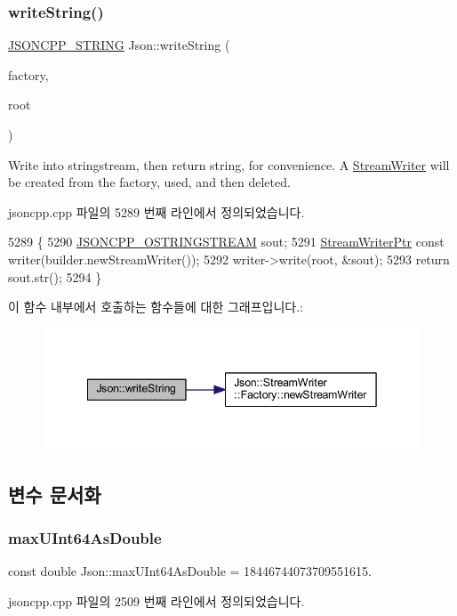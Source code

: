 \subsubsection{\texorpdfstring{write\+String()}{writeString()}}
{\footnotesize\ttfamily \hyperlink{json_8h_a1e723f95759de062585bc4a8fd3fa4be}{J\+S\+O\+N\+C\+P\+P\+\_\+\+S\+T\+R\+I\+NG} Json\+::write\+String (\begin{DoxyParamCaption}\item[{\hyperlink{class_json_1_1_stream_writer_1_1_factory}{Stream\+Writer\+::\+Factory} const \&}]{factory,  }\item[{\hyperlink{class_json_1_1_value}{Value} const \&}]{root }\end{DoxyParamCaption})}



Write into stringstream, then return string, for convenience. A \hyperlink{class_json_1_1_stream_writer}{Stream\+Writer} will be created from the factory, used, and then deleted. 



jsoncpp.\+cpp 파일의 5289 번째 라인에서 정의되었습니다.


\begin{DoxyCode}
5289                                                                                   \{
5290   \hyperlink{json-forwards_8h_a1d06ac2ca63c8c521f41231dfda0e6b3}{JSONCPP\_OSTRINGSTREAM} sout;
5291   \hyperlink{namespace_json_a7132404aeebfc96d7c6ad2c66260afb5}{StreamWriterPtr} \textcolor{keyword}{const} writer(builder.newStreamWriter());
5292   writer->write(root, &sout);
5293   \textcolor{keywordflow}{return} sout.str();
5294 \}
\end{DoxyCode}
이 함수 내부에서 호출하는 함수들에 대한 그래프입니다.\+:\nopagebreak
\begin{figure}[H]
\begin{center}
\leavevmode
\includegraphics[width=342pt]{namespace_json_a00820c0084189e2a7533531c0f250e3f_cgraph}
\end{center}
\end{figure}


\subsection{변수 문서화}
\mbox{\label{namespace_json_aecc0306aa526f25c5156f842182fb7fb}} 
\subsubsection{\texorpdfstring{max\+U\+Int64\+As\+Double}{maxUInt64AsDouble}}
{\footnotesize\ttfamily const double Json\+::max\+U\+Int64\+As\+Double = 18446744073709551615.\hspace{0.3cm}{\ttfamily [static]}}



jsoncpp.\+cpp 파일의 2509 번째 라인에서 정의되었습니다.

